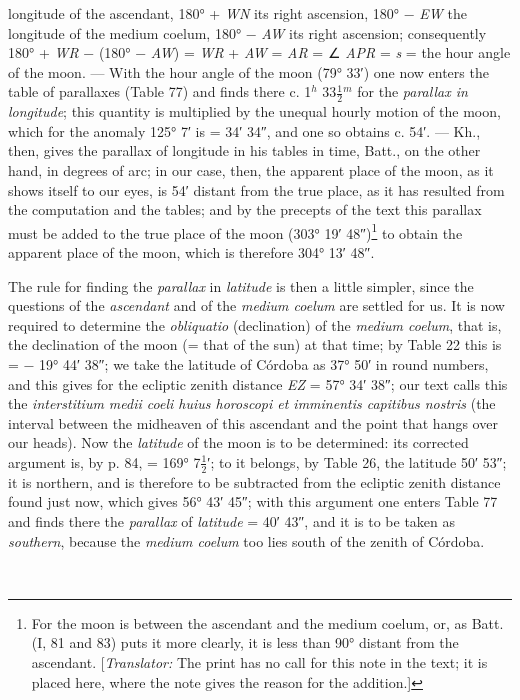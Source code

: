 \documentclass[11pt]{article}
\newcommand{\Pg}[1]{\marginpar{\footnotesize\color{gray}#1}}
\begin{document}
longitude of the ascendant, 180° + \emph{WN} its right ascension, 180° − \emph{EW} the longitude of the medium coelum, 180° − \emph{AW} its right ascension; consequently 180° + \emph{WR} − (180° − \emph{AW}) = \emph{WR} + \emph{AW} = \emph{AR} = {\SignFont\upshape ∠} \emph{APR} = \emph{s} = the hour angle of the moon. — With the hour angle of the moon (79° 33′) one now enters the table of parallaxes (Table 77) and finds there c. 1$^{h}$ 33$\tfrac{1}{2}$$^{m}$ for the \emph{parallax in longitude}; this quantity is multiplied by the unequal hourly motion of the moon, which for the anomaly 125° 7′ is = 34′ 34″, and one so obtains c. 54′. — Kh., then, gives the parallax of longitude in his tables in time, Batt., on the other hand, in degrees of arc; in our case, then, the apparent place of the moon, as it shows itself to our eyes, is 54′ distant from the true place, as it has resulted from the computation and the tables; and by the precepts of the text this parallax must be added to the true place of the moon (303° 19′ 48″)\footnote{For the moon is between the ascendant and the medium coelum, or, as Batt. (I, 81 and 83) puts it more clearly, it is less than 90° distant from the ascendant. [\emph{Translator:} The print has no call for this note in the text; it is placed here, where the note gives the reason for the addition.]} to obtain the apparent place of the moon, which is therefore 304° 13′ 48″.\par
\par \Pg{94}The rule for finding the \emph{parallax} in \emph{latitude} is then a little simpler, since the questions of the \emph{ascendant} and of the \emph{medium coelum} are settled for us. It is now required to determine the \emph{obliquatio} (declination) of the \emph{medium coelum}, that is, the declination of the moon (= that of the sun) at that time; by Table 22 this is = − 19° 44′ 38″; we take the latitude of Córdoba as 37° 50′ in round numbers, and this gives for the ecliptic zenith distance \emph{EZ} = 57° 34′ 38″; our text calls this the \emph{interstitium medii coeli huius horoscopi et imminentis capitibus nostris} (the interval between the midheaven of this ascendant and the point that hangs over our heads). Now the \emph{latitude} of the moon is to be determined: its corrected argument is, by p. 84, = 169° 7$\tfrac{1}{2}$′; to it belongs, by Table 26, the latitude 50′ 53″; it is northern, and is therefore to be subtracted from the ecliptic zenith distance found just now, which gives 56° 43′ 45″; with this argument one enters Table 77 and finds there the \emph{parallax} of \emph{latitude} = 40′ 43″, and it is to be taken as \emph{southern}, because the \emph{medium coelum} too lies south of the zenith of Córdoba.\par
$$
\end{document}
